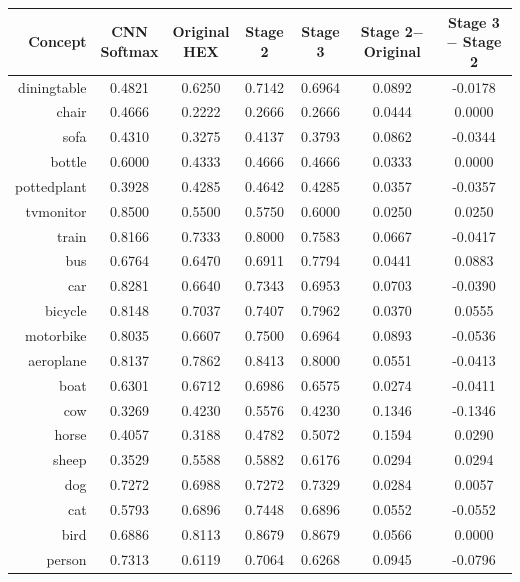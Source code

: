 \documentclass[11pt,a4paper]{book}
\begin{document}
\begin{table}[htbp]
\centering
\begin{tabular}{r|c|c|c|c|c|c}
Concept & \makecell{CNN\\Softmax} & \makecell{Original\\HEX} & Stage 2 & Stage 3 & \makecell{Stage 2$-$\\Original} & \makecell{Stage 3$-$\\Stage 2}\\\hline
diningtable   & 0.4821 & 0.6250 & 0.7142 & 0.6964 & 0.0892 & -0.0178\\
chair         & 0.4666 & 0.2222 & 0.2666 & 0.2666 & 0.0444 & 0.0000\\
sofa          & 0.4310 & 0.3275 & 0.4137 & 0.3793 & 0.0862 & -0.0344\\
bottle        & 0.6000 & 0.4333 & 0.4666 & 0.4666 & 0.0333 & 0.0000\\
pottedplant   & 0.3928 & 0.4285 & 0.4642 & 0.4285 & 0.0357 & -0.0357\\
tvmonitor     & 0.8500 & 0.5500 & 0.5750 & 0.6000 & 0.0250 & 0.0250\\
train         & 0.8166 & 0.7333 & 0.8000 & 0.7583 & 0.0667 & -0.0417\\
bus           & 0.6764 & 0.6470 & 0.6911 & 0.7794 & 0.0441 & 0.0883\\
car           & 0.8281 & 0.6640 & 0.7343 & 0.6953 & 0.0703 & -0.0390\\
bicycle       & 0.8148 & 0.7037 & 0.7407 & 0.7962 & 0.0370 & 0.0555\\
motorbike     & 0.8035 & 0.6607 & 0.7500 & 0.6964 & 0.0893 & -0.0536\\
aeroplane     & 0.8137 & 0.7862 & 0.8413 & 0.8000 & 0.0551 & -0.0413\\
boat          & 0.6301 & 0.6712 & 0.6986 & 0.6575 & 0.0274 & -0.0411\\
cow           & 0.3269 & 0.4230 & 0.5576 & 0.4230 & 0.1346 & -0.1346\\
horse         & 0.4057 & 0.3188 & 0.4782 & 0.5072 & 0.1594 & 0.0290\\
sheep         & 0.3529 & 0.5588 & 0.5882 & 0.6176 & 0.0294 & 0.0294\\
dog           & 0.7272 & 0.6988 & 0.7272 & 0.7329 & 0.0284 & 0.0057\\
cat           & 0.5793 & 0.6896 & 0.7448 & 0.6896 & 0.0552 & -0.0552\\
bird          & 0.6886 & 0.8113 & 0.8679 & 0.8679 & 0.0566 & 0.0000\\
person        & 0.7313 & 0.6119 & 0.7064 & 0.6268 & 0.0945 & -0.0796\\\hline

\end{tabular}
\end{table}
\end{document}
